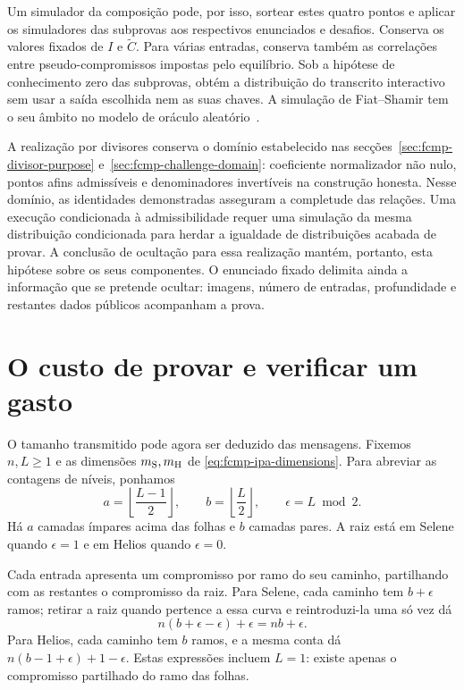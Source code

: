 Um simulador da composição pode, por isso, sortear estes
quatro pontos e aplicar os simuladores das subprovas aos
respectivos enunciados e desafios. Conserva os valores
fixados de \(I\) e \(\widetilde C\). Para várias entradas,
conserva também as correlações entre pseudo-compromissos
impostas pelo equilíbrio. Sob a hipótese de conhecimento
zero das subprovas, obtém a distribuição do transcrito
interactivo sem usar a saída escolhida nem as suas chaves.
A simulação de Fiat--Shamir tem o seu âmbito no modelo
de oráculo aleatório~\cite{fcmp-composition-review}.

A realização por divisores conserva o domínio estabelecido
nas secções~\ref{sec:fcmp-divisor-purpose}
e~\ref{sec:fcmp-challenge-domain}: coeficiente normalizador
não nulo, pontos afins admissíveis e denominadores
invertíveis na construção honesta. Nesse domínio, as
identidades demonstradas asseguram a completude das
relações. Uma execução condicionada à admissibilidade
requer uma simulação da mesma distribuição condicionada
para herdar a igualdade de distribuições acabada de provar.
A conclusão de ocultação para essa realização mantém,
portanto, esta hipótese sobre os seus componentes.
O enunciado fixado delimita ainda a informação que se
pretende ocultar: imagens, número de entradas, profundidade
e restantes dados públicos acompanham a prova.

\section{O custo de provar e verificar um gasto}
\label{sec:fcmp-commitment-counts}
\label{sec:fcmp-proof-size}
\label{sec:fcmp-total-work}

O tamanho transmitido pode agora ser deduzido das mensagens.
Fixemos \(n,L\geq1\) e as dimensões
\(m_{\rm S},m_{\rm H}\) de \eqref{eq:fcmp-ipa-dimensions}.
Para abreviar as contagens de níveis, ponhamos
\[
 a=\left\lfloor\frac{L-1}{2}\right\rfloor,\qquad
 b=\left\lfloor\frac L2\right\rfloor,\qquad
 \epsilon=L\bmod2.
\]
Há \(a\) camadas ímpares acima das folhas e \(b\)
camadas pares. A raiz está em Selene quando \(\epsilon=1\)
e em Helios quando \(\epsilon=0\).

Cada entrada apresenta um compromisso por ramo do seu
caminho, partilhando com as restantes o compromisso da
raiz. Para Selene, cada caminho tem \(b+\epsilon\)
ramos; retirar a raiz quando pertence a essa curva e
reintroduzi-la uma só vez dá
\[
 n(b+\epsilon-\epsilon)+\epsilon=nb+\epsilon.
\]
Para Helios, cada caminho tem \(b\) ramos, e a mesma
conta dá \(n(b-1+\epsilon)+1-\epsilon\).
Estas expressões incluem \(L=1\): existe apenas o
compromisso partilhado do ramo das folhas.

